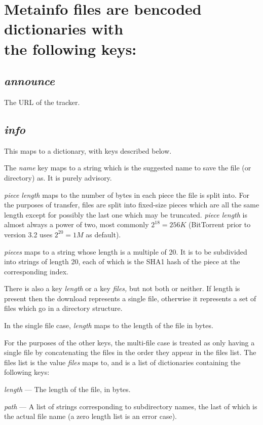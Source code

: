 \documentclass{article}
\begin{document}
{\section {Metainfo files are bencoded dictionaries with \\ the following keys:}}
{\subsection{\it announce}}
    The URL of the tracker.

{\subsection{\it info}}
    This maps to a dictionary, with keys described below.

    The {\it name} key maps to a string which is the suggested name to save the file (or directory) as. It is purely advisory.

    {\it piece length} maps to the number of bytes in each piece the file is split into. For the purposes of transfer, files are split into fixed-size pieces which are all the same length except for possibly the last one which may be truncated. {\it piece length} is almost always a power of two, most commonly $2^{18} = 256 K$ (BitTorrent prior to version 3.2 uses $2^{20} = 1 M$ as default).

    {\it pieces} maps to a string whose length is a multiple of 20. It is to be subdivided into strings of length 20, each of which is the SHA1 hash of the piece at the corresponding index.

    There is also a key {\it length} or a key {\it files,} but not both or neither. If length is present then the download represents a single file, otherwise it represents a set of files which go in a directory structure.

    In the single file case, {\it length} maps to the length of the file in bytes.

    For the purposes of the other keys, the multi-file case is treated as only having a single file by concatenating the files in the order they appear in the files list. The files list is the value {\it files} maps to, and is a list of dictionaries containing the following keys:

    {\it length} --- The length of the file, in bytes.

    {\it path} --- A list of strings corresponding to subdirectory names, the last of which is the actual file name (a zero length list is an error case).
\end{document}
